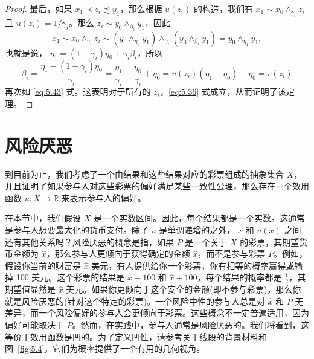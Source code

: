 \begin{proof}
最后，如果 \({x}_{1} \prec  {z}_{i} \precsim  {y}_{1}\)，那么根据 \(u\left( {z}_{i}\right)\) 的构造，我们有 \({x}_{1} \sim  {x}_{0}{ \land  }_{{\gamma }_{i}}{z}_{i}\) 且 \(u\left( {z}_{i}\right)  = 1/{\gamma }_{i}\)。那么 \({z}_{i} \sim  {y}_{0}{ \land  }_{{\beta }_{i}}{y}_{1}\)，因此
\[
{x}_{1} \sim  {x}_{0}{ \land  }_{{\gamma }_{i}}{z}_{i} \sim  \left( {{y}_{0}{ \land  }_{{\eta }_{0}}{y}_{1}}\right) { \land  }_{{\gamma }_{i}}\left( {{y}_{0}{ \land  }_{{\beta }_{i}}{y}_{1}}\right)  = {y}_{0}{ \land  }_{{\eta }_{1}}{y}_{1},
\]
也就是说， \({\eta }_{1} = \left( {1 - {\gamma }_{i}}\right) {\eta }_{0} + {\gamma }_{i}{\beta }_{i}\)，所以
\[
{\beta }_{i} = \frac{{\eta }_{1} - \left( {1 - {\gamma }_{i}}\right) {\eta }_{0}}{{\gamma }_{i}} = \frac{{\eta }_{1}}{{\gamma }_{i}} - \frac{{\eta }_{0}}{{\gamma }_{i}} + {\eta }_{0} = u\left( {z}_{i}\right) \left( {{\eta }_{1} - {\eta }_{0}}\right)  + {\eta }_{0} = v\left( {z}_{i}\right)
\]
再次如 \eqref{eq:5.43} 式。这表明对于所有的 \({z}_{i}\)，\eqref{eq:5.36} 式成立，从而证明了该定理。
\end{proof}

\section{风险厌恶}\label{sec:5.9}
到目前为止，我们考虑了一个由结果和这些结果对应的彩票组成的抽象集合 \(X\)，并且证明了如果参与人对这些彩票的偏好满足某些一致性公理，那么存在一个效用函数 \(u : X \rightarrow  \mathbb{R}\) 来表示参与人的偏好。

在本节中，我们假设 \(X\) 是一个实数区间。因此，每个结果都是一个实数。这通常是参与人想要最大化的货币支付。除了 \(u\) 是单调递增的之外， \(x\) 和 \(u\left( x\right)\) 之间还有其他关系吗？风险厌恶的概念是指，如果 \(P\) 是一个关于 \(X\) 的彩票，其期望货币金额为 \(\widehat{x}\)，那么参与人更倾向于获得确定的金额 \(\widehat{x}\)，而不是参与彩票 \(P\)。例如，假设你当前的财富是 \(\widehat{x}\) 美元，有人提供给你一个彩票，你有相等的概率赢得或输掉 100 美元。这个彩票的结果是 \(\widehat{x} - {100}\) 和 \(\widehat{x} + {100}\)，每个结果的概率都是 \(\frac{1}{2}\)，其期望值显然是 \(\widehat{x}\) 美元。如果你更倾向于这个安全的金额(即不参与彩票)，那么你就是风险厌恶的(针对这个特定的彩票)。一个风险中性的参与人总是对 \(\widehat{x}\) 和 \(P\) 无差异，而一个风险偏好的参与人会更倾向于彩票。这些概念不一定普遍适用，因为偏好可能取决于 \(P\)。然而，在实践中，参与人通常是风险厌恶的。我们将看到，这等价于效用函数是凹的。为了定义凹性，请参考关于线段的背景材料和图~\ref{fig:5.4}，它们为概率提供了一个有用的几何视角。

